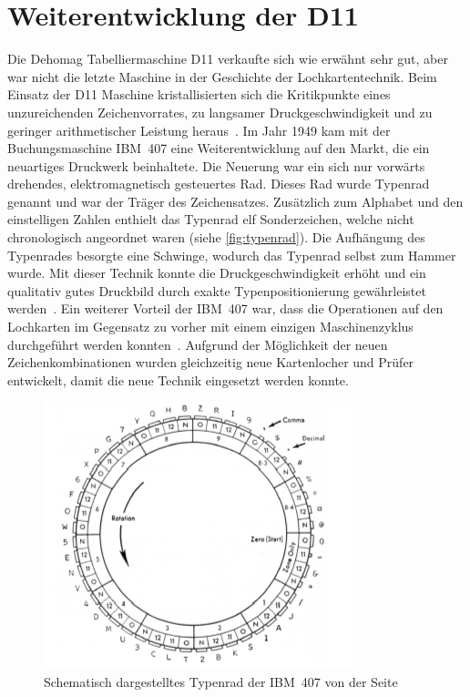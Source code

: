\documentclass[parskip=half]{scrartcl}
\begin{document}
\section{Weiterentwicklung der D11}

Die Dehomag Tabelliermaschine D11 verkaufte sich wie erwähnt sehr gut, aber war
nicht die letzte Maschine in der Geschichte der Lochkartentechnik. Beim Einsatz
der D11 Maschine kristallisierten sich die Kritikpunkte eines unzureichenden
Zeichenvorrates, zu langsamer Druckgeschwindigkeit und zu geringer
arithmetischer Leistung heraus~\cite{sandner}. Im Jahr 1949 kam mit der
Buchungsmaschine IBM~407 eine Weiterentwicklung auf den Markt, die ein
neuartiges Druckwerk beinhaltete. Die Neuerung war ein sich nur vorwärts
drehendes, elektromagnetisch gesteuertes Rad. Dieses Rad wurde Typenrad genannt
und war der Träger des Zeichensatzes. Zusätzlich zum Alphabet und den
einstelligen Zahlen enthielt das Typenrad elf Sonderzeichen, welche nicht
chronologisch angeordnet waren (siehe \autoref{fig:typenrad}). Die Aufhängung
des Typenrades besorgte eine Schwinge, wodurch das Typenrad selbst zum Hammer
wurde. Mit dieser Technik konnte die Druckgeschwindigkeit erhöht und ein
qualitativ gutes Druckbild durch exakte Typenpositionierung gewährleistet
werden~\cite{sandner}. Ein weiterer Vorteil der IBM~407 war, dass die
Operationen auf den Lochkarten im Gegensatz zu vorher mit einem einzigen
Maschinenzyklus durchgeführt werden konnten~\cite{Boyell}. Aufgrund der
Möglichkeit der neuen Zeichenkombinationen wurden gleichzeitig neue
Kartenlocher und Prüfer entwickelt, damit die neue Technik eingesetzt werden
konnte.

\begin{figure}[h]
  \centering
  \includegraphics{typenrad}
  \caption{Schematisch dargestelltes Typenrad der IBM~407 von der Seite~\cite{sandner}}
  \label{fig:typenrad}
\end{figure}
\end{document}
